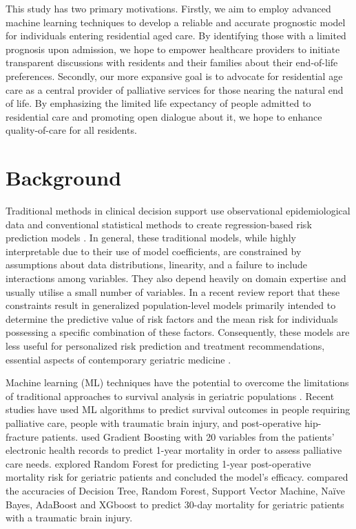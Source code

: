 \documentclass{article}
\begin{document}
This study has two primary motivations. Firstly, we aim to employ advanced machine learning techniques to develop a reliable and accurate prognostic model for individuals entering residential aged care. By identifying those with a limited prognosis upon admission, we hope to empower healthcare providers to initiate transparent discussions with residents and their families about their end-of-life preferences. Secondly, our more expansive goal is to advocate for residential age care as a central provider of palliative services for those nearing the natural end of life. By emphasizing the limited life expectancy of people admitted to residential care and promoting open dialogue about it, we hope to enhance quality-of-care for all residents.


\section{Background}

Traditional methods in clinical decision support use observational epidemiological data and conventional statistical methods to create regression-based risk prediction models \cite{woodman2023comprehensive}. In general, these traditional models, while highly interpretable due to their use of model coefficients, are constrained by assumptions about data distributions, linearity, and a failure to include interactions among variables. They also depend heavily on domain expertise and usually utilise a small number of variables. In a recent review \citet{woodman2023comprehensive} report that these constraints result in generalized population-level models primarily intended to determine the predictive value of risk factors and the mean risk for individuals possessing a specific combination of these factors. Consequently, these models are less useful for personalized risk prediction and treatment recommendations, essential aspects of contemporary geriatric medicine \cite{martens2023personalized}.

Machine learning (ML) techniques have the potential to overcome the limitations of traditional approaches to survival analysis in geriatric populations   \cite{olender2023application}.  Recent studies have used ML algorithms to predict survival outcomes in people requiring palliative care, people with traumatic brain injury, and post-operative hip-fracture patients.  \cite{blanes2021responsive,wang2023prediction, Xing2022rf} \citet{blanes2021responsive} used Gradient Boosting with 20 variables from the patients' electronic health records to predict 1-year mortality in order to assess palliative care needs. \citet{Xing2022rf} explored Random Forest for predicting 1-year post-operative mortality risk for geriatric patients and concluded the model's efficacy.  \citet{wang2023prediction} compared the accuracies of Decision Tree, Random Forest, Support Vector Machine, Naïve Bayes, AdaBoost and XGboost to predict 30-day mortality for geriatric patients with a traumatic brain injury.
\end{document}
